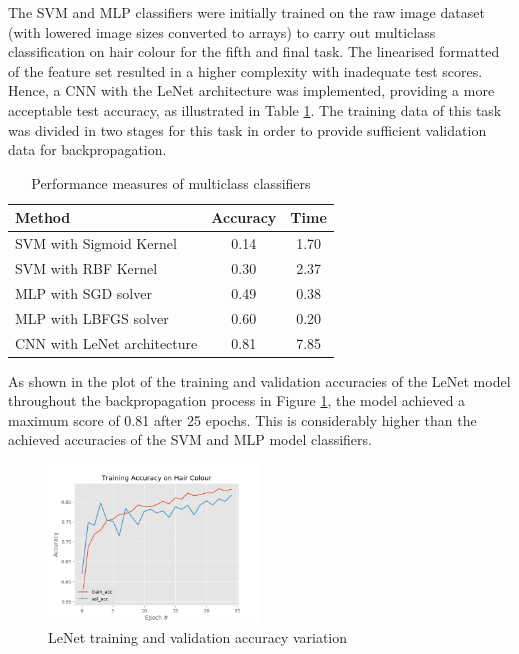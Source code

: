 \documentclass[conference]{IEEEtran}
\begin{document}
The SVM and MLP classifiers were initially trained on the raw image dataset (with lowered image sizes converted to arrays) to carry out multiclass classification on hair colour for the fifth and final task. The linearised formatted of the feature set resulted in a higher complexity with inadequate test scores. Hence, a CNN with the LeNet architecture was implemented, providing a more acceptable test accuracy, as illustrated in Table \ref{tab: mult}.
The training data of this task was divided in two stages for this task in order to provide sufficient validation data for backpropagation. 

\begin{table}[htp]
\caption{Performance measures of multiclass classifiers}
\begin{center}
\renewcommand{\arraystretch}{1.5}
\begin{tabular}{|l|c|c|}
\hline
\hspace{1cm} Method & Accuracy & Time\\ \hline
SVM with Sigmoid Kernel & 0.14 & 1.70\\ \hline
SVM with RBF Kernel & 0.30 & 2.37\\ \hline
MLP with SGD solver & 0.49 & 0.38\\ \hline
MLP with LBFGS solver & 0.60 & 0.20\\ \hline
CNN with LeNet architecture & 0.81 & 7.85\\ \hline
\end{tabular}
\end{center}
\label{tab: mult}
\end{table}%

\break

As shown in the plot of the training and validation accuracies of the LeNet model throughout the backpropagation process in Figure \ref{fig: CNN}, the model achieved a maximum score of 0.81 after 25 epochs. This is considerably higher than the achieved accuracies of the SVM and MLP model classifiers.

\begin{figure} [h] %
  \centering
    \includegraphics[width=0.5\textwidth]{graphs/T5_CNN_Keras} 
    \caption{LeNet training and validation accuracy variation}
    \label{fig: CNN}
\end{figure}
\end{document}

